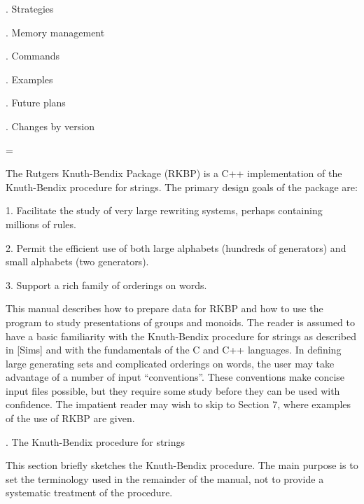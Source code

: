 \medskip
{}.  Strategies\par

\medskip
{}.  Memory management\par

\medskip
{}.  Commands\par

\medskip
{}.  Examples\par

\medskip
{}.  Future plans\par

\medskip
{}.  Changes by version\par

\vfil

\break
\footline={\hfil\tenrm\folio\hfil}

The Rutgers Knuth-Bendix Package (RKBP) is a C++ implementation of
the Knuth-Bendix procedure for strings.  The primary design goals of
the package are:

\smallskip

\item{1.} Facilitate the study of very large rewriting systems, perhaps
containing millions of rules.
\item{2.} Permit the efficient use of both large alphabets (hundreds of
generators) and small alphabets (two generators).
\item{3.} Support a rich family of orderings on words.

\medskip

This manual describes how to prepare data for RKBP and how to use the
program to study presentations of groups and monoids.  The reader is
assumed to have a basic familiarity with the Knuth-Bendix procedure
for strings as described in [Sims] and with the fundamentals of the C
and C++ languages.  In defining large generating sets and complicated
orderings on words, the user may take advantage of a number of input
``conventions''.  These conventions make concise input files possible,
but they require some study before they can be used with confidence.
The impatient reader may wish to skip to Section 7, where examples of
the use of RKBP are given.

\bigskip

. The Knuth-Bendix procedure for strings

\nobreak

This section briefly sketches the Knuth-Bendix procedure.  The main
purpose is to set the terminology used in the remainder of the manual,
not to provide a systematic treatment of the procedure.

